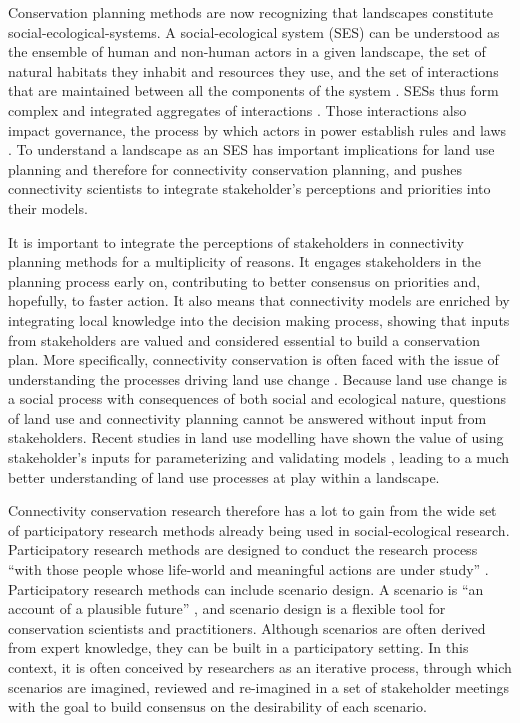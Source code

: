 Conservation planning methods are now recognizing that landscapes constitute social-ecological-systems. A social-ecological system (SES) can be understood as the ensemble of human and non-human actors in a given landscape, the set of natural habitats they inhabit and resources they use, and the set of interactions that are maintained between all the components of the system \citep{ostrom_general_2009}. SESs thus form complex and integrated aggregates of interactions \citep{hinkel_enhancing_2014}. Those interactions also impact governance, the process by which actors in power establish rules and laws \citep{bissonnette_comparing_2018}. To understand a landscape as an SES has important implications for land use planning and therefore for connectivity conservation planning, and pushes connectivity scientists to integrate stakeholder’s perceptions and priorities into their models. 

It is important to integrate the perceptions of stakeholders in connectivity planning methods for a multiplicity of reasons. It engages stakeholders in the planning process early on, contributing to better consensus on priorities and, hopefully, to faster action. It also means that connectivity models are enriched by integrating local knowledge into the decision making process, showing that inputs from stakeholders are valued and considered essential to build a conservation plan. More specifically, connectivity conservation is often faced with the issue of understanding the processes driving land use change \citep{worboys_connectivity_2010}. Because land use change is a social process with consequences of both social and ecological nature, questions of land use and connectivity planning cannot be answered without input from stakeholders. Recent studies in land use modelling have shown the value of using stakeholder’s inputs for parameterizing and validating models \citep{hewitt_participatory_2014, voinov_modelling_2010}, leading to a much better understanding of land use processes at play within a landscape.

Connectivity conservation research therefore has a lot to gain from the wide set of participatory research methods already being used in social-ecological research. Participatory research methods are designed to conduct the research process “with those people whose life-world and meaningful actions are under study” \citep{bergold_participatory_2012}. Participatory research methods can include scenario design. A scenario is “an account of a plausible future” \citep{peterson_scenario_2003}, and scenario design is a flexible tool for conservation scientists and practitioners. Although scenarios are often derived from expert knowledge, they can be built in a participatory setting. In this context, it is often conceived by researchers as an iterative process, through which scenarios are imagined, reviewed and re-imagined in a set of stakeholder meetings with the goal to build consensus on the desirability of each scenario. 

